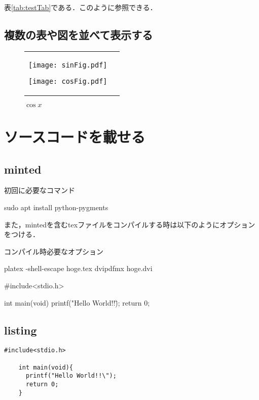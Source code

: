 \documentclass[a4j,titlepage,dvipdfmx,uplatex]{jsarticle}   %
\begin{document}
  表\ref{tab:testTab}である．このように参照できる．

  \subsection{複数の表や図を並べて表示する}
  \begin{figure}[H]
    \begin{tabular}{cc}
      \begin{minipage}{0.5\hsize}
        \centering
        \texttt{[image: sinFig.pdf]}
        \caption{$\sin{x}$}
        \label{fig:sin}
      \end{minipage}
      \begin{minipage}{0.5\hsize}
        \centering
        \texttt{[image: cosFig.pdf]}
        \caption{$\cos{x}$}
        \label{fig:cos}
      \end{minipage}
    \end{tabular}
  \end{figure}
  \section{ソースコードを載せる}
  \subsection{minted}
  \begin{listing}[H]
    \caption{初回に必要なコマンド}
    \begin{shellcode}
      sudo apt install python-pygments
    \end{shellcode}
  \end{listing}
  また，mintedを含むtexファイルをコンパイルする時は以下のようにオプションをつける．
  \begin{listing}[H]
    \caption{コンパイル時必要なオプション}
    \begin{shellcode}
      platex -shell-escape hoge.tex
      dvipdfmx hoge.dvi
    \end{shellcode}
  \end{listing}
  \begin{myMinted}
    #include<stdio.h>

    int main(void){
      printf("Hello World!!\");
      return 0;
    }
  \end{myMinted}

  \subsection{listing}
  \begin{lstlisting}[caption=listingのテスト,label=listTest]
    #include<stdio.h>

    int main(void){
      printf("Hello World!!\");
      return 0;
    }
  \end{lstlisting}
\end{document}
